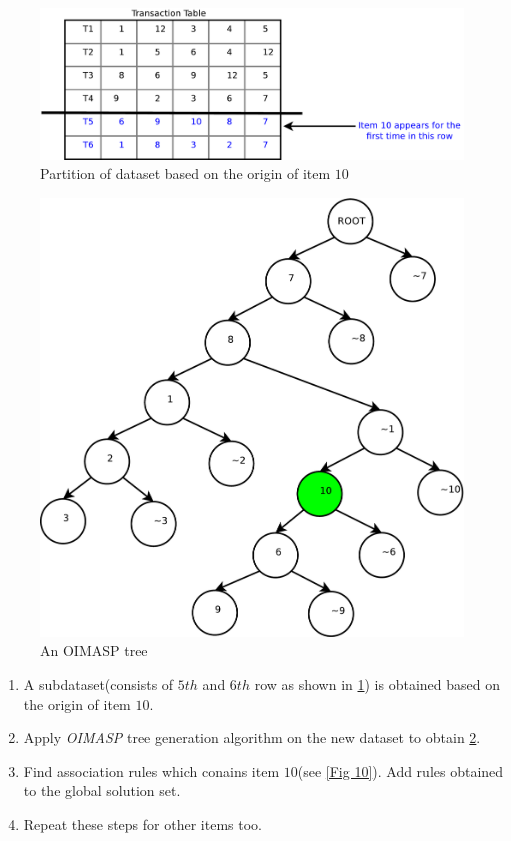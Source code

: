 \documentclass[review]{elsarticle}
\begin{document}
\begin{figure}
\begin{center}
\includegraphics[scale=0.35]{pdf/partition}
\end{center}
\caption{Partition of dataset based on the origin of item $ 10 $}
\label{Fig 8}
\end{figure}

\begin{figure}
\begin{center}
\includegraphics[scale=0.35]{pdf/moimasp}
\end{center}
\caption{An OIMASP tree}
\label{Fig 9}
\end{figure}

\begin{enumerate}[Step 1.]
\item A subdataset(consists of $ 5th $ and $ 6th $ row as shown in \ref{Fig 8}) is obtained based on the origin of item $ 10 $.
\item Apply \emph{OIMASP} tree generation algorithm on the new dataset to obtain \ref{Fig 9}.
\item Find association rules which conains item $ 10 $(see \ref{Fig 10}). Add rules obtained to the global solution set.
\item Repeat these steps for other items too.
\end{enumerate}
\end{document}
